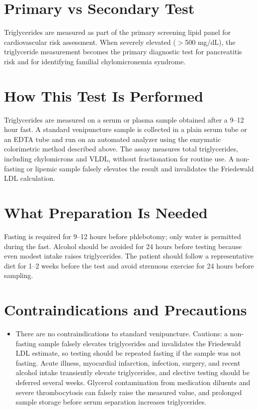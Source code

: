 \section*{Primary vs Secondary Test}
Triglycerides are measured as part of the primary screening lipid panel for cardiovascular risk assessment. When severely elevated ($>$500 mg/dL), the triglyceride measurement becomes the primary diagnostic test for pancreatitis risk and for identifying familial chylomicronemia syndrome.
\section*{How This Test Is Performed}
Triglycerides are measured on a serum or plasma sample obtained after a 9--12 hour fast. A standard venipuncture sample is collected in a plain serum tube or an EDTA tube and run on an automated analyzer using the enzymatic colorimetric method described above. The assay measures total triglycerides, including chylomicrons and VLDL, without fractionation for routine use. A non-fasting or lipemic sample falsely elevates the result and invalidates the Friedewald LDL calculation.
\section*{What Preparation Is Needed}
Fasting is required for 9--12 hours before phlebotomy; only water is permitted during the fast. Alcohol should be avoided for 24 hours before testing because even modest intake raises triglycerides. The patient should follow a representative diet for 1--2 weeks before the test and avoid strenuous exercise for 24 hours before sampling.
\section*{Contraindications and Precautions}
\begin{itemize}
  \item There are no contraindications to standard venipuncture. Cautions: a non-fasting sample falsely elevates triglycerides and invalidates the Friedewald LDL estimate, so testing should be repeated fasting if the sample was not fasting. Acute illness, myocardial infarction, infection, surgery, and recent alcohol intake transiently elevate triglycerides, and elective testing should be deferred several weeks. Glycerol contamination from medication diluents and severe thrombocytosis can falsely raise the measured value, and prolonged sample storage before serum separation increases triglycerides.
\end{itemize}
